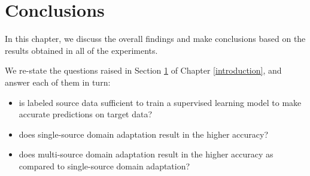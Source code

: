\cleardoublepage

\chapter{Conclusions}
\label{colcusionschapter}

In this chapter, we discuss the overall findings and make conclusions based on the results obtained in all of the experiments.


We re-state the questions raised in Section \ref{colcusionschapter} of Chapter \ref{introduction}, and answer each of them in turn:

\begin{itemize}
  \item is labeled source data sufficient to train a supervised learning model to make accurate predictions on target data?




  \item does single-source domain adaptation result in the higher accuracy?






  \item does multi-source domain adaptation result in the higher accuracy as compared to single-source domain adaptation?



  
\end{itemize}



